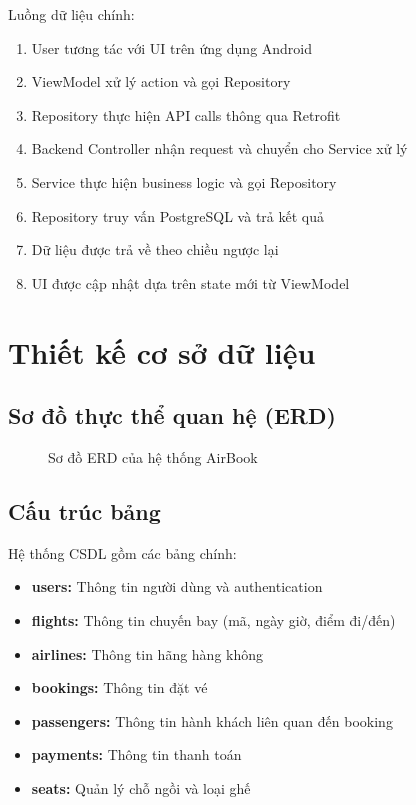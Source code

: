 Luồng dữ liệu chính:
\begin{enumerate}
    \item User tương tác với UI trên ứng dụng Android
    \item ViewModel xử lý action và gọi Repository
    \item Repository thực hiện API calls thông qua Retrofit
    \item Backend Controller nhận request và chuyển cho Service xử lý
    \item Service thực hiện business logic và gọi Repository
    \item Repository truy vấn PostgreSQL và trả kết quả
    \item Dữ liệu được trả về theo chiều ngược lại
    \item UI được cập nhật dựa trên state mới từ ViewModel
\end{enumerate}

\section{Thiết kế cơ sở dữ liệu}

\subsection{Sơ đồ thực thể quan hệ (ERD)}

\begin{figure}[H]
\centering
\caption{Sơ đồ ERD của hệ thống AirBook}
\end{figure}

\subsection{Cấu trúc bảng}
Hệ thống CSDL gồm các bảng chính:

\begin{itemize}[leftmargin=1cm]
    \item \textbf{users:} Thông tin người dùng và authentication
    \item \textbf{flights:} Thông tin chuyến bay (mã, ngày giờ, điểm đi/đến)
    \item \textbf{airlines:} Thông tin hãng hàng không
    \item \textbf{bookings:} Thông tin đặt vé
    \item \textbf{passengers:} Thông tin hành khách liên quan đến booking
    \item \textbf{payments:} Thông tin thanh toán
    \item \textbf{seats:} Quản lý chỗ ngồi và loại ghế
\end{itemize}

